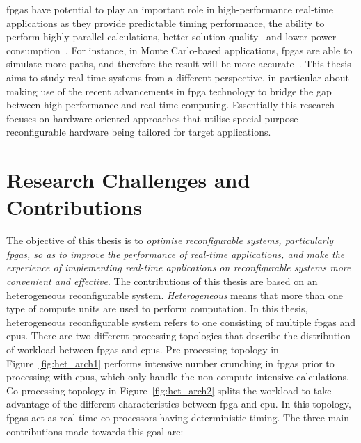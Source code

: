 \glspl{fpga} have potential to play an important role in high-performance real-time applications as they provide predictable timing performance, the ability to 
perform highly parallel calculations, better solution quality~\cite{chau13fpt,chau14fccm} and lower power consumption~\cite{chau13arc}.
For instance, in Monte Carlo-based applications, \glspl{fpga} are able to simulate more paths, and therefore the result will be more accurate~\cite{chau14fccm}.
This thesis aims to study real-time systems from a different perspective, in particular about making use of the recent advancements in \gls{fpga} technology to bridge the gap between high performance and real-time computing.
Essentially this research focuses on hardware-oriented approaches that utilise special-purpose reconfigurable hardware being tailored for target applications.

\section{Research Challenges and Contributions}

The objective of this thesis is to \textit{optimise reconfigurable systems, particularly \glspl{fpga}, so as to improve the performance of real-time applications, and make the experience of implementing real-time applications on reconfigurable systems more convenient and effective}.
The contributions of this thesis are based on an heterogeneous reconfigurable system.
\textit{Heterogeneous} means that more than one type of compute units are used to perform computation. 
In this thesis, heterogeneous reconfigurable system refers to one consisting of multiple \glspl{fpga} and \glspl{cpu}.
There are two different processing topologies that describe the distribution of workload between \glspl{fpga} and \glspl{cpu}.
Pre-processing topology in Figure~\ref{fig:het_arch1} performs intensive number crunching in \glspl{fpga} prior to processing with \glspl{cpu}, which only handle the non-compute-intensive calculations.
Co-processing topology in Figure~\ref{fig:het_arch2} splits the workload to take advantage of the different characteristics between \gls{fpga} and \gls{cpu}.
In this topology, \glspl{fpga} act as real-time co-processors having deterministic timing.
The three main contributions made towards this goal are:

